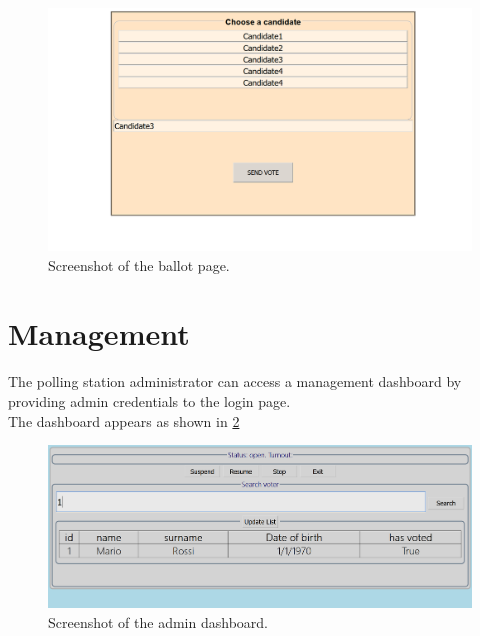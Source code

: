 \begin{figure}[H]
    \begin{center}
        \includegraphics[scale=0.6, trim={3cm 0 3cm 0},clip]{img/ballot.png}
    \end{center}
    \vspace*{-0.5cm}
    \caption{Screenshot of the ballot page.}
    \label{fig:ballot}
\end{figure}
\pagebreak
\section*{Management}
The polling station administrator can access a management dashboard by providing admin credentials to the login page.\\
The dashboard appears as shown in \ref{fig:dashboard}

\begin{figure}[H]
    \begin{center}
        \includegraphics[scale=0.4]{img/dashboard.png}
    \end{center}
    \vspace*{-0.5cm}
    \caption{Screenshot of the admin dashboard.}
    \label{fig:dashboard}
\end{figure}